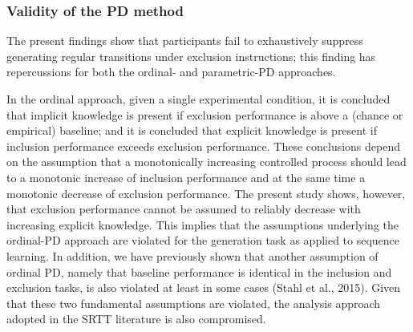 \documentclass[english,,man]{apa6}
\begin{document}
\hypertarget{validity-of-the-pd-method}{%
\subsubsection{Validity of the PD method}\label{validity-of-the-pd-method}}

The present findings show that participants fail to exhaustively suppress generating regular transitions under exclusion instructions;
this finding has repercussions for both the ordinal- and parametric-PD approaches.

In the ordinal approach, given a single experimental condition, it is concluded that implicit knowledge is present if exclusion performance is above a (chance or empirical) baseline; and it is concluded that explicit knowledge is present if inclusion performance exceeds exclusion performance.
These conclusions depend on the assumption that a monotonically increasing controlled process should lead to a monotonic increase of inclusion performance and at the same time a monotonic decrease of exclusion performance.
The present study shows, however, that exclusion performance cannot be assumed to reliably decrease with increasing explicit knowledge.
This implies that the assumptions underlying the ordinal-PD approach are violated for the generation task as applied to sequence learning.
In addition, we have previously shown that another assumption of ordinal PD, namely that baseline performance is identical in the inclusion and exclusion tasks, is also violated at least in some cases (Stahl et al., 2015).
Given that these two fundamental assumptions are violated, the analysis approach adopted in the SRTT literature is also compromised.
\end{document}
